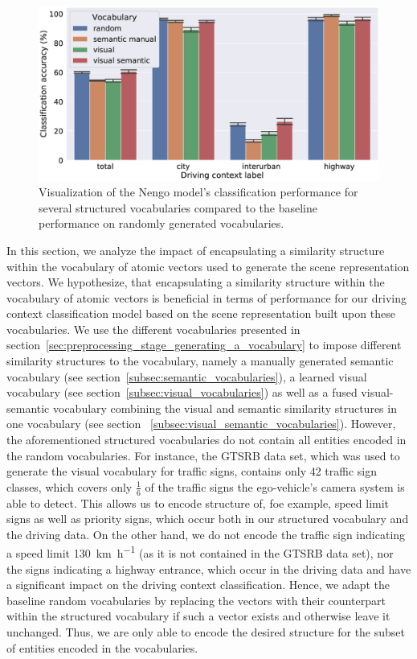 \begin{figure}[t]
    \centering
    \includegraphics[width=1.\linewidth]{imgs/context_class_vocabularies_tp_and_ts.eps}
    \caption{Visualization of the \ac{Nengo} model's classification performance for several structured vocabularies compared to the baseline performance on randomly generated vocabularies.}
    \label{fig:context_class_vocabularies_tp_and_ts}
\end{figure}

In this section, we analyze the impact of encapsulating a similarity structure within the vocabulary of atomic vectors used to generate the scene representation vectors.
We hypothesize, that encapsulating a similarity structure within the vocabulary of atomic vectors is beneficial in terms of performance for our driving context classification model based on the scene representation built upon these vocabularies.
We use the different vocabularies presented in section~\ref{sec:preprocessing_stage_generating_a_vocabulary} to impose different similarity structures to the vocabulary, namely a manually generated semantic vocabulary (see section~\ref{subsec:semantic_vocabularies}), a learned visual vocabulary (see section~\ref{subsec:visual_vocabularies}) as well as a fused visual-semantic vocabulary combining the visual and semantic similarity structures in one vocabulary (see section
~\ref{subsec:visual_semantic_vocabularies}).
However, the aforementioned structured vocabularies do not contain all entities encoded in the random vocabularies.
For instance, the \ac{GTSRB} data set, which was used to generate the visual vocabulary for traffic signs, contains only \num{42} traffic sign classes, which covers only $\frac{1}{6}$ of the traffic signs the ego-vehicle's camera system is able to detect.
This allows us to encode structure of, foe example, speed limit signs as well as priority signs, which occur both in our structured vocabulary and the driving data.
On the other hand, we do not encode the traffic sign indicating a speed limit \SI[per-mode=symbol]{130}{\kilo\meter\per\hour} (as it is not contained in the \ac{GTSRB} data set), nor the signs indicating a highway entrance, which occur in the driving data and have a significant impact on the driving context classification.
Hence, we adapt the baseline random vocabularies by replacing the vectors with their counterpart within the structured vocabulary if such a vector exists and otherwise leave it unchanged.
Thus, we are only able to encode the desired structure for the subset of entities encoded in the vocabularies.

